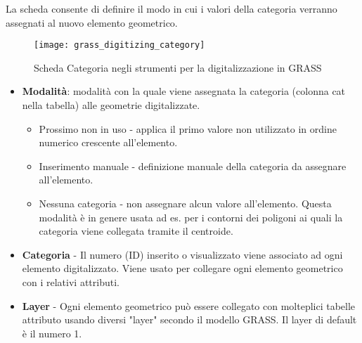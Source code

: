 
La scheda  consente di definire il modo in cui i valori
della categoria verranno assegnati al nuovo elemento geometrico.

\begin{figure}[h]
 \begin{center}
  \caption{Scheda Categoria negli strumenti per la digitalizzazione in GRASS \nixcaption}\label{fig:grass_digitizing_category}
  \texttt{[image: grass\_digitizing\_category]}
 \end{center}
\end{figure}

\begin{itemize}
\item \textbf{Modalità}: modalità con la quale viene assegnata la categoria
(colonna cat nella tabella) alle geometrie digitalizzate.
\begin{itemize}
\item Prossimo non in uso - applica il primo valore non utilizzato in ordine
numerico crescente all'elemento.
\item Inserimento manuale - definizione manuale della categoria da assegnare
all'elemento.
\item Nessuna categoria - non assegnare alcun valore all'elemento. Questa
modalità è in genere usata ad es. per i contorni dei poligoni ai quali la
categoria viene collegata tramite il centroide.
\end{itemize}
\item \textbf{Categoria} - Il numero (ID) inserito o visualizzato viene
associato ad ogni elemento digitalizzato. Viene usato per collegare ogni
elemento geometrico con i relativi attributi.
\item \textbf{Layer} - Ogni elemento geometrico può essere collegato
con molteplici tabelle attributo usando diversi "layer" secondo il
modello GRASS. Il layer di default è il numero 1. 
\end{itemize}

\begin{Tip}\caption{\textsc{Creare un "layer" GRASS aggiuntivo con QGIS}}
\end{Tip}

